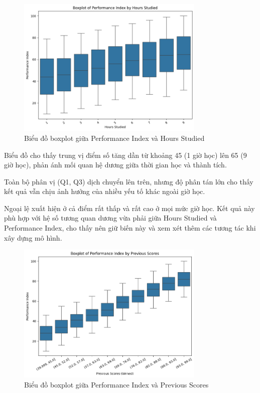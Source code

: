 \begin{figure}[H]
	\centering
	\includegraphics[width=0.8\textwidth]{images/eda/3.png}
	\caption{Biểu đồ boxplot giữa Performance Index và Hours Studied}
\end{figure}

Biểu đồ cho thấy trung vị điểm số tăng dần từ khoảng 45 (1 giờ học) lên 65 (9 giờ học), phản ánh mối quan hệ dương giữa thời gian học và thành tích.

Toàn bộ phân vị (Q1, Q3) dịch chuyển lên trên, nhưng độ phân tán lớn cho thấy kết quả vẫn chịu ảnh hưởng của nhiều yếu tố khác ngoài giờ học.

Ngoại lệ xuất hiện ở cả điểm rất thấp và rất cao ở mọi mức giờ học. Kết quả này phù hợp với hệ số tương quan dương vừa phải giữa Hours Studied và Performance Index, cho thấy nên giữ biến này và xem xét thêm các tương tác khi xây dựng mô hình.

\begin{figure}[H]
	\centering
	\includegraphics[width=0.8\textwidth]{images/eda/4.png}
	\caption{Biểu đồ boxplot giữa Performance Index và Previous Scores}
\end{figure}

